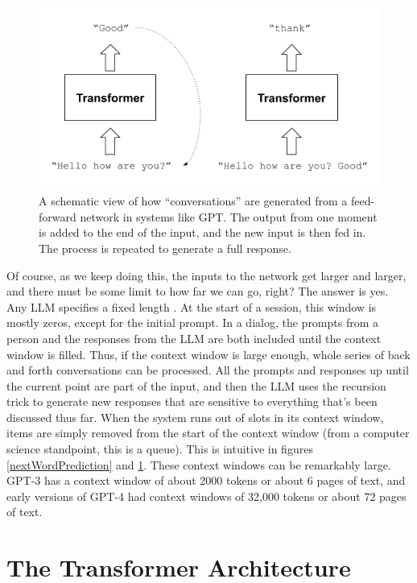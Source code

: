\begin{figure}[h]
\centering
\includegraphics[scale=.7]{./images/gptRecursedInputs.png}
\caption[Jeff Yoshimi]{A schematic view of how ``conversations'' are generated from a feed-forward network in systems like GPT. The output from one moment is added to the end of the input, and the new input is then fed in. The process is repeated to generate a full response.}
\label{gptRecursedInputs}
\end{figure}

Of course, as we keep doing this, the inputs to the network get larger and larger, and there must be some limit to how far we can go, right?  The answer is yes. Any LLM specifies a fixed length . At the start of a session, this window is mostly zeros, except for the initial prompt.  In a dialog, the prompts from a person and the responses from the LLM are both included until the context window is filled. Thus, if the context window is large enough, whole series of back and forth conversations can be processed.  All the prompts and responses up until the current point are part of the input, and then the LLM uses the recursion trick to generate new responses that are sensitive to everything that's been discussed thus far. When the system runs out of slots in its context window, items are simply removed from the start of the context window (from a computer science standpoint, this is a queue). This is intuitive in figures \ref{nextWordPrediction} and \ref{gptRecursedInputs}. These context windows can be remarkably large. GPT-3 has a context window of about 2000 tokens or about 6 pages of text, and early versions of GPT-4 had context windows of 32,000 tokens or about 72 pages of text.  

\section{The Transformer Architecture}\label{transformers}

